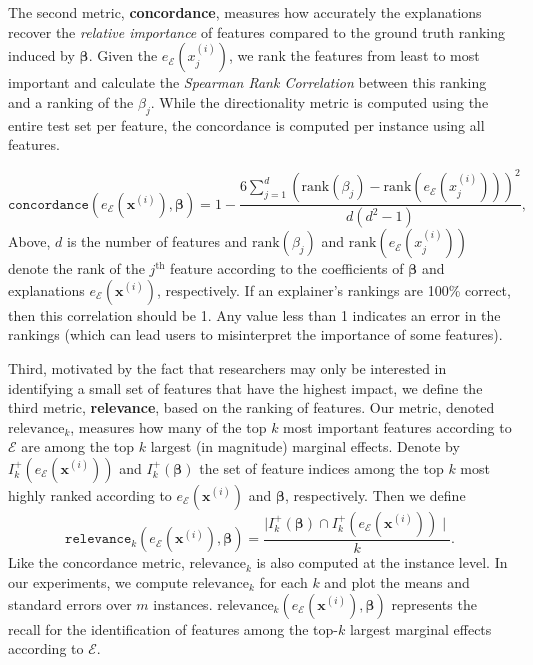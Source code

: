 \documentclass[12pt]{article}  %
\newcommand{\mE}{\mathcal{E}}
\begin{document}
      The second metric, \textbf{concordance}, measures how accurately the explanations recover the \textit{relative importance} of features compared to the ground truth ranking induced by $\boldsymbol{\beta}$. Given the $e_\mathcal{E}(x^{(i)}_j)$, we rank the features from least to most important and calculate the \emph{Spearman Rank Correlation} \cite{spearman1904proof} between this ranking and a ranking of the $\beta_j$. While the directionality metric is computed using the entire test set per feature, the concordance is computed per instance using all features.

    \begin{equation}
       \texttt{concordance}(e_\mE(\mathbf{x}^{(i)}),\boldsymbol{\beta}) = 1 - \frac{6\sum_{j=1}^d (\text{rank}(\beta_j) - \text{rank}(e_\mE(x^{(i)}_j)))^2}{d(d^2-1)},
    \end{equation}
    Above, $d$ is the number of features and $\text{rank}(\beta_j)$ and $\text{rank}(e_\mE(x^{(i)}_j))$ denote the rank of the $j^{\text{th}}$ feature according to the coefficients of $\boldsymbol{\beta}$ and explanations $e_\mE(\mathbf{x}^{(i)})$, respectively. If an explainer's rankings are 100\% correct, then this correlation should be 1. Any value less than 1 indicates an error in the rankings (which can lead users to misinterpret the importance of some features).
    
Third, motivated by the fact that researchers may only be interested in identifying a small set of features that have the highest impact, we define the third metric, \textbf{relevance}, based on the ranking of features. Our metric, denoted $\text{relevance}_k$, measures how many of the top $k$ most important features according to $\mathcal{E}$  are among the top $k$ largest (in magnitude) marginal effects. Denote by $I_k^+(e_\mE(\mathbf{x}^{(i)}))$ and $I_k^+(\boldsymbol{\beta})$  the set of feature indices among the top $k$ most highly ranked according to $e_\mE(\mathbf{x}^{(i)})$ and $\boldsymbol{\beta}$, respectively. Then we define 
    \begin{equation}
        \texttt{relevance}_k(e_\mE(\mathbf{x}^{(i)}), \boldsymbol{\beta}) = \frac{\mid I_k^+(\boldsymbol{\beta}) \cap I_k^+(e_\mE(\mathbf{x}^{(i)}))\mid}{k}.
    \end{equation}
     Like the concordance metric, $\text{relevance}_k$ is also computed at the instance level. 
    In our experiments, we compute $\text{relevance}_k$ for each $k$ and plot the means and standard errors over $m$ instances. $\text{relevance}_k(e_\mE(\mathbf{x}^{(i)}), \boldsymbol{\beta})$ represents the recall for the identification of features among the top-$k$ largest marginal effects according to $\mathcal{E}$.       
    
\end{document}

